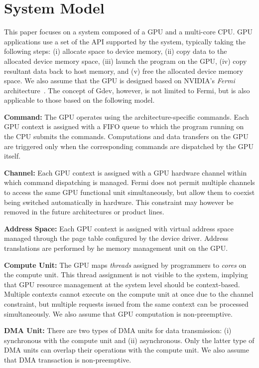 \vspace{-0.25em}
\section{System Model}
\label{sec:model}
\vspace{-0.25em}

This paper focuses on a system composed of a GPU and a multi-core CPU.
GPU applications use a set of the API supported by the system, typically
taking the following steps:
(i) allocate space to device memory, 
(ii) copy data to the allocated device memory space, 
(iii) launch the program on the GPU, 
(iv) copy resultant data back to host memory, and 
(v) free the allocated device memory space.
We also assume that the GPU is designed based on NVIDIA's \textit{Fermi}
architecture~\cite{Fermi}.
The concept of Gdev, however, is not limited to Fermi, but is also
applicable to those based on the following model.

\textbf{Command:}
The GPU operates using the architecture-specific commands.
Each GPU context is assigned with a FIFO queue to which the program
running on the CPU submits the commands.
Computations and data transfers on the GPU are triggered only when the
corresponding commands are dispatched by the GPU itself.

\textbf{Channel:}
Each GPU context is assigned with a GPU hardware channel within which
command dispatching is managed.
Fermi does not permit multiple channels to access the
same GPU functional unit simultaneously, but allow them to coexist being
switched automatically in hardware.
This constraint may however be removed in the future architectures or
product lines.

\textbf{Address Space:}
Each GPU context is assigned with virtual address space managed through
the page table configured by the device driver.
Address translations are performed by he memory management unit on the
GPU.

\begin{comment}
\textbf{I/O Register:}
The GPU provides a bunch of memory-mapped I/O registers per context
visible to the device driver through the (PCI) I/O bus.
The device driver needs to manage these registers to send commands and
set up channels and address space.
\end{comment}

\textbf{Compute Unit:}
The GPU maps \textit{threads} assigned by programmers to \textit{cores}
on the compute unit.
This thread assignment is not visible to the system, implying that GPU
resource management at the system level should be context-based. 
Multiple contexts cannot execute on the compute unit at once due to the
channel constraint, but multiple requests issued from the same context
can be processed simultaneously.
We also assume that GPU computation is non-preemptive.

\textbf{DMA Unit:}
There are two types of DMA units for data transmission: (i) synchronous
with the compute unit and (ii) asynchronous.
Only the latter type of DMA units can overlap their operations with the
compute unit.
We also assume that DMA transaction is non-preemptive.
